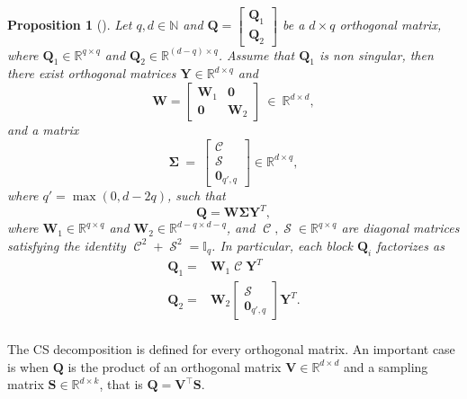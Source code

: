 \documentclass[twoside,11pt]{book}
\newtheorem{proposition}{Proposition}
\DeclareMathOperator{\Tran}{\intercal}
\DeclareMathOperator{\Sinmatrix}{\mathcal{S}}
\DeclareMathOperator{\Cosmatrix}{\mathcal{C}}
\begin{document}
\begin{proposition}[\citealp{GoVa96}]
Let $q,d \in \mathbb{N}$ and $\bm{Q} =
\left[
\begin{array}{c}
\bm{Q}_{1}  \\
\hline
\bm{Q}_{2}
\end{array}
\right]
$ be a $d\times q$ orthogonal matrix, where $\bm{Q}_{1} \in \mathbb{R}^{q \times q}$ and $\bm{Q}_{2} \in \mathbb{R}^{(d-q)\times q}$. Assume that $\bm{Q}_{1}$ is non singular, then there exist orthogonal matrices $\bm{Y}\in\mathbb{R}^{d \times q}$ and
\begin{equation}
 \bm{W} =
\left[
\begin{array}{c|c}
\bm{W}_{1} & \bm{0} \\
\hline
\bm{0} & \bm{W}_{2}
\end{array}
\right]~\in~\mathbb{R}^{d \times d},
\end{equation}
and a matrix
\begin{equation}
\bm{\Sigma}~=~\left[
\begin{array}{c}
\Cosmatrix \\
\hline
\Sinmatrix \\
\hline
\bm{0}_{q',q}
\end{array}
\right] \in \mathbb{R}^{d \times q},
\end{equation}
where $q' = \max(0,d-2q)$, such that
\begin{equation}
    \bm{Q} = \bm{W}\bm{\Sigma}\bm{Y}^{T},
\end{equation}
where $\bm{W}_{1} \in \mathbb{R}^{q \times q}$ and $\bm{W}_{2} \in \mathbb{R}^{d-q \times d-q}$, and $\Cosmatrix, \Sinmatrix \in \mathbb{R}^{q\times q}$ are diagonal matrices satisfying the identity $\Cosmatrix^{2} + \Sinmatrix^{2} = \mathbb{I}_{q}$.
In particular, each block $\bm{Q}_{i}$ factorizes as
\begin{equation}
\begin{split}
    \bm{Q}_{1} = & \bm{W}_{1}\Cosmatrix\bm{Y}^{T} \\
    \bm{Q}_{2} = & \bm{W}_{2}\left[
\begin{array}{c}
\Sinmatrix \\
\hline
\bm{0}_{q',q}
\end{array}
\right]\bm{Y}^{T} .\\
\end{split}
\end{equation}

\label{CSD_proposition}
\end{proposition}
The CS decomposition is defined for every orthogonal matrix. An important case is when $\bm{Q}$ is the product of an orthogonal matrix $\bm{V} \in \mathbb{R}^{d \times d}$ and a sampling matrix $\bm{S} \in \mathbb{R}^{d \times k}$, that is $\bm{Q} = \bm{V}^{\Tran}\bm{S}$.
\end{document}
